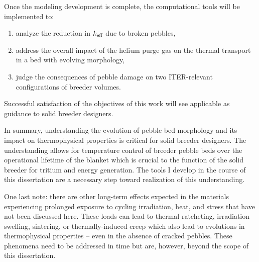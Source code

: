 Once the modeling development is complete, the computational tools will be implemented to:
\begin{enumerate}
	\item analyze the reduction in $k_\text{eff}$ due to broken pebbles,
	\item address the overall impact of the helium purge gas on the thermal transport in a bed with evolving morphology,
	\item judge the consequences of pebble damage on two ITER-relevant configurations of breeder volumes.
\end{enumerate}

Successful satisfaction of the objectives of this work will see applicable as guidance to solid breeder designers.


In summary, understanding the evolution of pebble bed morphology and its impact on thermophysical properties is critical for solid breeder designers. The understanding allows for temperature control of breeder pebble beds over the operational lifetime of the blanket which is crucial to the function of the solid breeder for tritium and energy generation. The tools I develop in the course of this dissertation are a necessary step toward realization of this understanding. 

One last note: there are other long-term effects expected in the materials experiencing prolonged exposure to cycling irradiation, heat, and stress that have not been discussed here. These loads can lead to thermal ratcheting, irradiation swelling, sintering, or thermally-induced creep which also lead to evolutions in thermophysical properties -- even in the absence of cracked pebbles. These phenomena need to be addressed in time but are, however, beyond the scope of this dissertation. 
